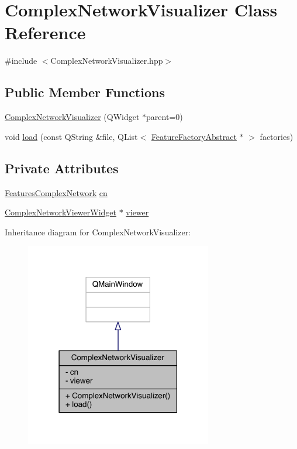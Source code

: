 \hypertarget{class_complex_network_visualizer}{\section{Complex\+Network\+Visualizer Class Reference}
\label{class_complex_network_visualizer}
}


{\ttfamily \#include $<$Complex\+Network\+Visualizer.\+hpp$>$}

\subsection*{Public Member Functions}
\begin{DoxyCompactItemize}
\item 
\hyperlink{class_complex_network_visualizer_ab3a04b1188388d45ae59d38d5d4ece61}{Complex\+Network\+Visualizer} (Q\+Widget $\ast$parent=0)
\item 
void \hyperlink{class_complex_network_visualizer_a0d903a9d363d23aa9ec1e2481ee8018b}{load} (const Q\+String \&file, Q\+List$<$ \hyperlink{class_feature_factory_abstract}{Feature\+Factory\+Abstract} $\ast$ $>$ factories)
\end{DoxyCompactItemize}
\subsection*{Private Attributes}
\begin{DoxyCompactItemize}
\item 
\hyperlink{class_features_complex_network}{Features\+Complex\+Network} \hyperlink{class_complex_network_visualizer_afa26bcc018204f4c6cc11113ccc28762}{cn}
\item 
\hyperlink{class_complex_network_viewer_widget}{Complex\+Network\+Viewer\+Widget} $\ast$ \hyperlink{class_complex_network_visualizer_a4bf3a5e10e49bc3add70d1db9aa16fa2}{viewer}
\end{DoxyCompactItemize}


Inheritance diagram for Complex\+Network\+Visualizer\+:\nopagebreak
\begin{figure}[H]
\begin{center}
\leavevmode
\includegraphics[width=231pt]{class_complex_network_visualizer__inherit__graph}
\end{center}
\end{figure}


